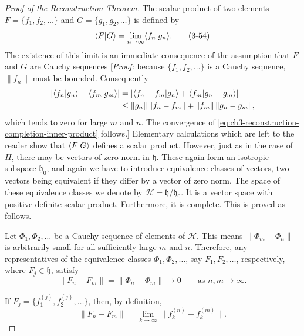 \begin{proof}[Proof of the Reconstruction Theorem]
The scalar product of two elements \(F=\{f_1,f_2,\ldots\}\) and
\(G=\{g_1,g_2,\ldots\}\) is defined by
\begin{equation}
\langle F\vert G\rangle=\lim_{n\to\infty}\langle f_n\vert g_n\rangle .
\tag{3-54}\label{eq:ch3-reconstruction-completion-inner-product}
\end{equation}
The existence of this limit is an immediate consequence of the assumption
that \(F\) and \(G\) are Cauchy sequences [\emph{Proof:} because
\(\{f_1,f_2,\ldots\}\) is a Cauchy sequence, \(\lVert f_n\rVert\) must be
bounded.  Consequently
\begin{equation*}
\begin{aligned}
\lvert\langle f_n\vert g_n\rangle-\langle f_m\vert g_m\rangle\rvert
 &=\lvert\langle f_n-f_m\vert g_n\rangle+\langle f_m\vert g_n-g_m\rangle\rvert\\
 &\leq \lVert g_n\rVert\,\lVert f_n-f_m\rVert
       +\lVert f_m\rVert\,\lVert g_n-g_m\rVert,
\end{aligned}
\end{equation*}
which tends to zero for large \(m\) and \(n\).  The convergence of \eqref{eq:ch3-reconstruction-completion-inner-product}
follows.]  Elementary calculations which are left to the reader show that
\(\langle F\vert G\rangle\) defines a scalar product.  However, just as in the case of
\(H\), there may be vectors of zero norm in \(\mathfrak h\).  These again form
an isotropic subspace \(\mathfrak h_0\), and again we have to introduce
equivalence classes of vectors, two vectors being equivalent if they differ by
a vector of zero norm.  The space of these equivalence classes we denote by
\(\mathcal H=\mathfrak h/\mathfrak h_0\).  It is a vector space with positive
definite scalar product.  Furthermore, it is complete.  This is proved as
follows.

Let \(\Phi_1,\Phi_2,\ldots\) be a Cauchy sequence of elements of \(\mathcal H\).
This means \(\lVert\Phi_m-\Phi_n\rVert\) is arbitrarily small for all
sufficiently large \(m\) and \(n\).  Therefore, any representatives of the
equivalence classes \(\Phi_1,\Phi_2,\ldots\), say \(F_1,F_2,\ldots\),
respectively, where \(F_j\in\mathfrak h\), satisfy
\begin{equation*}
\lVert F_n-F_m\rVert=\lVert\Phi_n-\Phi_m\rVert\longrightarrow 0
\qquad\text{as }n,m\longrightarrow\infty .
\end{equation*}

If \(F_j=\{f_1^{(j)},f_2^{(j)},\ldots\}\), then, by definition,
\begin{equation*}
\lVert F_n-F_m\rVert
 =\lim_{k\to\infty}\lVert f_k^{(n)}-f_k^{(m)}\rVert .
\end{equation*}


\end{proof}
